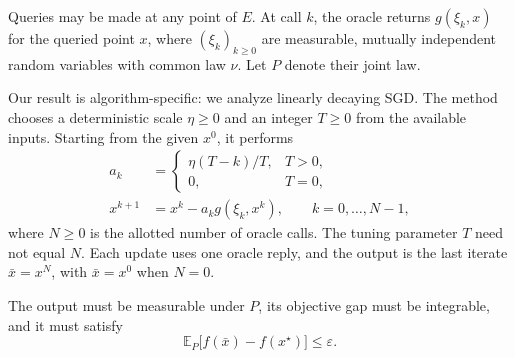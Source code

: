 \documentclass[10pt]{article}
\theoremstyle{definition}
\begin{document}
Queries may be made at any point of $E$. At call $k$, the oracle returns $g(\xi_k,x)$ for the queried point $x$, where $(\xi_k)_{k\geq0}$ are measurable, mutually independent random variables with common law $\nu$. Let $P$ denote their joint law.

Our result is algorithm-specific: we analyze linearly decaying SGD. The method chooses a deterministic scale $\eta\geq0$ and an integer $T\geq0$ from the available inputs. Starting from the given $x^0$, it performs
\[
\begin{aligned}
a_k&=\begin{cases}
\eta(T-k)/T,&T>0,\\
0,&T=0,
\end{cases}\\
x^{k+1}&=x^k-a_k g(\xi_k,x^k),\qquad k=0,\ldots,N-1,
\end{aligned}
\]
where $N\geq0$ is the allotted number of oracle calls. The tuning parameter $T$ need not equal $N$. Each update uses one oracle reply, and the output is the last iterate $\bar{x}=x^N$, with $\bar{x}=x^0$ when $N=0$.

The output must be measurable under $P$, its objective gap must be integrable, and it must satisfy
\[
\mathbb{E}_{P}\bigl[f(\bar{x})-f(x^\star)\bigr]\leq\varepsilon.
\]
\end{document}
